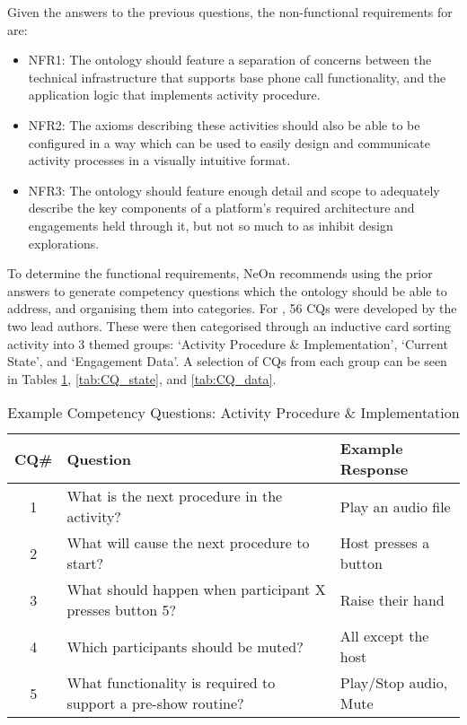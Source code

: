 Given the answers to the previous questions, the non-functional requirements for \ONT{} are:

\begin{itemize}
    \item NFR1: The ontology should feature a separation of concerns between the technical infrastructure that supports base phone call functionality, and the application logic that implements activity procedure.
    \item NFR2: The axioms describing these activities should also be able to be configured in a way which can be used to easily design and communicate activity processes in a visually intuitive format.
    \item NFR3: The ontology should feature enough detail and scope to adequately describe the key components of a platform's required architecture and engagements held through it, but not so much to as inhibit design explorations.
\end{itemize}

To determine the functional requirements, NeOn recommends using the prior answers to generate competency questions which the ontology should be able to address, and organising them into categories. For \ONT{}, 56 CQs were developed by the two lead authors. These were then categorised through an inductive card sorting activity into 3 themed groups: `Activity Procedure \& Implementation', `Current State', and `Engagement Data'. A selection of CQs from each group can be seen in Tables \ref{tab:CQ_activity}, \ref{tab:CQ_state}, and \ref{tab:CQ_data}.

\begin{table}
  \caption{Example Competency Questions: Activity Procedure \& Implementation}
  \label{tab:CQ_activity}
  \begin{tabular}{cll}
    \toprule
    CQ\#&Question&Example Response\\
    \midrule
    1&What is the next procedure in the activity?&Play an audio file\\
    2&What will cause the next procedure to start?&Host presses a button\\
    3&What should happen when participant X presses button 5?&Raise their hand\\
    4&Which participants should be muted?&All except the host\\
    5&What functionality is required to support a pre-show routine?&Play/Stop audio, Mute\\
  \bottomrule
\end{tabular}
\end{table}

